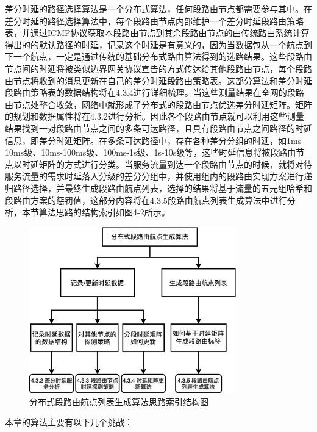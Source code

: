 差分时延的路径选择算法是一个分布式算法，任何段路由节点都需要参与其中。在差分时延的路径选择算法中，每个段路由节点内部维护一个差分时延段路由策略表，并通过ICMP协议获取本段路由节点到其余段路由节点的由传统路由系统计算得出的的默认路径的时延，记录这个时延是有意义的，因为当数据包从一个航点到下一个航点，一定是通过传统的基础分布式路由算法得到的选路结果。这些段路由节点间的时延将被类似边界网关协议宣告的方式传达给其他段路由节点，每个段路由节点将收到的消息更新在自己的差分时延段路由策略表。这部分算法和差分时延段路由策略表的数据结构将在4.3.4进行详细梳理。当这些测量结果在全网的段路由节点处整合收敛，网络中就形成了分布式的段路由节点优选差分时延矩阵。矩阵的规划和数据属性将在4.3.2进行分析。因此各个段路由节点就可以利用这些测量结果找到一对段路由节点之间的多条可达路径，且具有段路由节点之间路径的时延信息，即差分时延矩阵。在多条可达路径中，存在各种差分分组的时延，如1ms-10ms级、10ms-100ms级、100ms-1s级、1s-10s级等，这些时延信息将被段路由节点以时延矩阵的方式进行分类。当服务流量到达一个段路由节点的时候，就将对待服务流量的需求时延落入分级的差分分组中，并使用组内的段路由实现方案进行递归路径选择，并最终生成段路由航点列表，选择的结果将基于流量的五元组哈希和段路由方案的惩罚值，这部分内容将在4.3.5段路由航点列表生成算法中进行分析，本节算法思路的结构索引如图4-2所示。

\begin{figure}[htbp]
\setlength{\abovecaptionskip}{15pt plus 3pt minus 2pt}
\centerline{\includegraphics[width=0.8\textwidth]{./figures/ch4-ark.png}}
\caption{分布式段路由航点列表生成算法思路索引结构图}
\label{fig-ch4-ark}
\end{figure}

本章的算法主要有以下几个挑战：

